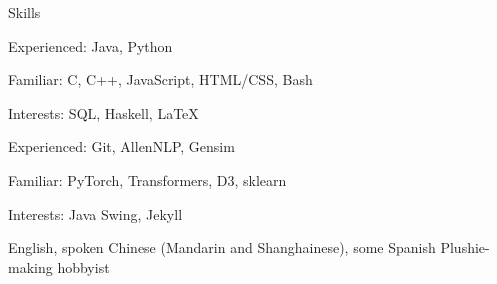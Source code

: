
\begin{rubric}{Skills}
    \par Experienced: Java, Python
    \par Familiar: C, C++, JavaScript, HTML/CSS, Bash
    \par Interests: SQL, Haskell, \LaTeX
{}
    \par Experienced: Git, AllenNLP, Gensim
    \par Familiar: PyTorch, Transformers, D3, sklearn
    \par Interests: Java Swing, Jekyll
    \par English, spoken Chinese (Mandarin and Shanghainese), some Spanish
\entry*[Misc.]
    Plushie-making hobbyist
\end{rubric}
